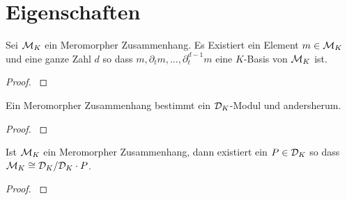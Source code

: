 \section{Eigenschaften}
\begin{comment}
\cite[4.2]{sabbah_cimpa90}
Let $\cM$ be a left $\cD$-module. First we consider it only as a
$\C\{x\}$-module and let $\cM[x^{-1}]$ be the localized module.
\end{comment}

\begin{lem}
\cite[Thm 4.3.3]{sabbah_cimpa90}
\cite[Satz 4.8]{ZulaBarbara}
Sei $\mathcal{M}_K$ ein Meromorpher Zusammenhang. Es Existiert ein Element
$m\in\mathcal{M}_K$ und eine ganze Zahl $d$ so dass
$m,\partial_tm,\dots,\partial_t^{d-1}m$ eine $K$-Basis von $\mathcal{M}_K$ ist.
\end{lem}
\begin{proof}
\cite[Satz 4.8]{ZulaBarbara}
\end{proof}

\begin{thm}
\cite[Thm 4.3.2]{sabbah_cimpa90}
Ein Meromorpher Zusammenhang bestimmt ein $\mathcal{D}_K$-Modul
und andersherum.
\end{thm}
\begin{proof}
\cite[Thm 4.3.2]{sabbah_cimpa90}
\end{proof}

\begin{lem}
\cite[Satz 4.12]{ZulaBarbara}
\cite[Thm 4.3.2]{sabbah_cimpa90}
Ist $\mathcal{M}_K$ ein Meromorpher Zusammenhang, dann existiert ein $P\in\mathcal{D}_K$ so
dass $\mathcal{M}_K\cong\mathcal{D}_K/\mathcal{D}_K\cdot P$.
\end{lem}
\begin{proof}
\cite[Satz 4.12]{ZulaBarbara}
\end{proof}
\begin{comment}
\begin{rem}
\cite[Proof of Theorem 5.4.7]{sabbah_cimpa90}
\[
\dim_{\hat K}\cM_{\hat K} =\deg P \mbox{ wenn } \cM_{\hat K}=\cD/\cD\cdot P
\]
\end{rem}
\end{comment}

